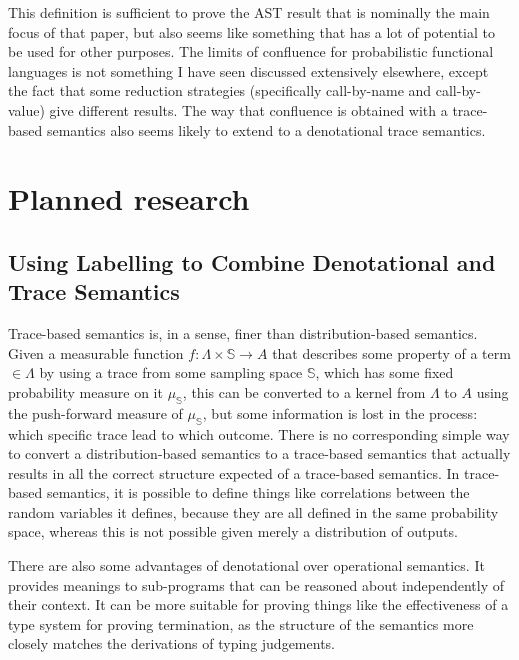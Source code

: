\documentclass[titlepage]{article}
\begin{document}
This definition is sufficient to prove the AST result that is nominally the main focus of that paper, but also seems like something that has a lot of potential to be used for other purposes. The limits of confluence for probabilistic functional languages is not something I have seen discussed extensively elsewhere, except the fact that some reduction strategies (specifically call-by-name and call-by-value) give different results. The way that confluence is obtained with a trace-based semantics also seems likely to extend to a denotational trace semantics.


\section{Planned research}
\subsection{Using Labelling to Combine Denotational and Trace Semantics}
Trace-based semantics is, in a sense, finer than distribution-based semantics. Given a measurable function $f : \Lambda \times \mathbb S \to A$ that describes some property of a term $\in \Lambda$ by using a trace from some sampling space $\mathbb S$, which has some fixed probability measure on it $\mu_{\mathbb S}$, this can be converted to a kernel from $\Lambda$ to $A$ using the push-forward measure of $\mu_{\mathbb S}$, but some information is lost in the process: which specific trace lead to which outcome. There is no corresponding simple way to convert a distribution-based semantics to a trace-based semantics that actually results in all the correct structure expected of a trace-based semantics. In trace-based semantics, it is possible to define things like correlations between the random variables it defines, because they are all defined in the same probability space, whereas this is not possible given merely a distribution of outputs.

There are also some advantages of denotational over operational semantics. It provides meanings to sub-programs that can be reasoned about independently of their context. It can be more suitable for proving things like the effectiveness of a type system for proving termination, as the structure of the semantics more closely matches the derivations of typing judgements.%
\end{document}
